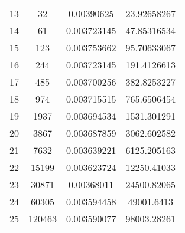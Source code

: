 \documentclass[a4paper,12pt]{article} %
\begin{document}
\begin{table}[H]
{\begin{tabular}{|c|c|c|c|}
			13                                                 & 32                   & 0.00390625                  & 23.92658267                                      \\
			14                                                 & 61                   & 0.003723145                 & 47.85316534                                      \\
			15                                                 & 123                  & 0.003753662                 & 95.70633067                                      \\
			16                                                 & 244                  & 0.003723145                 & 191.4126613                                      \\
			17                                                 & 485                  & 0.003700256                 & 382.8253227                                      \\
			18                                                 & 974                  & 0.003715515                 & 765.6506454                                      \\
			19                                                 & 1937                 & 0.003694534                 & 1531.301291                                      \\
			20                                                 & 3867                 & 0.003687859                 & 3062.602582                                      \\
			21                                                 & 7632                 & 0.003639221                 & 6125.205163                                      \\
			22                                                 & 15199                & 0.003623724                 & 12250.41033                                      \\
			23                                                 & 30871                & 0.00368011                  & 24500.82065                                      \\
			24                                                 & 60305                & 0.003594458                 & 49001.6413                                       \\
			25                                                 & 120463               & 0.003590077                 & 98003.28261                                      \\

\end{tabular}}
\end{table}
\end{document}
